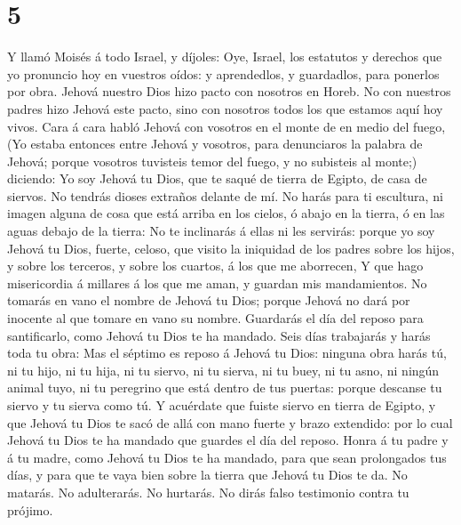 \hypertarget{section-4}{%
\section{5}\label{section-4}}

 Y llamó Moisés á todo Israel, y díjoles: Oye, Israel, los
estatutos y derechos que yo pronuncio hoy en vuestros oídos: y
aprendedlos, y guardadlos, para ponerlos por obra.  Jehová
nuestro Dios hizo pacto con nosotros en Horeb.  No con
nuestros padres hizo Jehová este pacto, sino con nosotros todos los que
estamos aquí hoy vivos.  Cara á cara habló Jehová con
vosotros en el monte de en medio del fuego,  (Yo estaba
entonces entre Jehová y vosotros, para denunciaros la palabra de Jehová;
porque vosotros tuvisteis temor del fuego, y no subisteis al monte;)
diciendo:  Yo soy Jehová tu Dios, que te saqué de tierra de
Egipto, de casa de siervos.  No tendrás dioses extraños
delante de mí.  No harás para ti escultura, ni imagen alguna
de cosa que está arriba en los cielos, ó abajo en la tierra, ó en las
aguas debajo de la tierra:  No te inclinarás á ellas ni les
servirás: porque yo soy Jehová tu Dios, fuerte, celoso, que visito la
iniquidad de los padres sobre los hijos, y sobre los terceros, y sobre
los cuartos, á los que me aborrecen,  Y que hago
misericordia á millares á los que me aman, y guardan mis mandamientos.
 No tomarás en vano el nombre de Jehová tu Dios; porque
Jehová no dará por inocente al que tomare en vano su nombre.
 Guardarás el día del reposo para santificarlo, como Jehová
tu Dios te ha mandado.  Seis días trabajarás y harás toda
tu obra:  Mas el séptimo es reposo á Jehová tu Dios:
ninguna obra harás tú, ni tu hijo, ni tu hija, ni tu siervo, ni tu
sierva, ni tu buey, ni tu asno, ni ningún animal tuyo, ni tu peregrino
que está dentro de tus puertas: porque descanse tu siervo y tu sierva
como tú.  Y acuérdate que fuiste siervo en tierra de
Egipto, y que Jehová tu Dios te sacó de allá con mano fuerte y brazo
extendido: por lo cual Jehová tu Dios te ha mandado que guardes el día
del reposo.  Honra á tu padre y á tu madre, como Jehová tu
Dios te ha mandado, para que sean prolongados tus días, y para que te
vaya bien sobre la tierra que Jehová tu Dios te da.  No
matarás.  No adulterarás.  No hurtarás.
 No dirás falso testimonio contra tu prójimo. 
